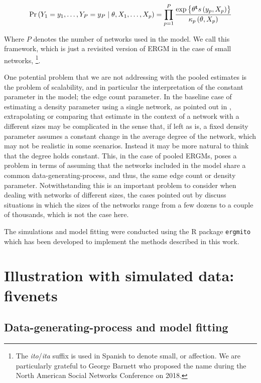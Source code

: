 \documentclass[12pt]{article}
\begin{document}
\begin{equation}
    \label{eq:ergm-pooled}
    \Prcond{\Adjmat_1 = \adjmat_1, \dots, \Adjmat_P = \adjmat_P}{\params, \Indepvar_1, \dots, \Indepvar_p} = \prod_{p=1}^P\frac{%
    		\exp{\transpose{\params}\sufstats{\adjmat_p, \Indepvar_p}}%
    	}{
    		\kappa_p\left(\params, \Indepvar_p\right)
    	}
\end{equation}

\noindent Where $P$ denotes the number of networks used in the model. We call this framework, which is just a revisited version of ERGM in the case of small networks, \ergmito{}\footnote{The \textit{ito}/\textit{ita} suffix is used in Spanish to denote small, or affection. We are particularly grateful to George Barnett who proposed the name during the North American Social Networks Conference on 2018.}.

One potential problem that we are not addressing with the pooled estimates is the problem of scalability, and in particular the interpretation of the constant parameter in the model; the edge count parameter. In the baseline case of estimating a density parameter using a single network, as pointed out in \cite{Krivitsky2011}, extrapolating or comparing that estimate in the context of a network with a different sizes may be complicated in the sense that, if left as is, a fixed density parameter assumes a constant change in the average degree of the network, which may not be realistic in some scenarios. Instead it may be more natural to think that the degree holds constant. This, in the case of pooled ERGMs, poses a problem in terms of assuming that the networks included in the model share a common data-generating-process, and thus, the same edge count or density parameter. Notwithstanding this is an important problem to consider when dealing with networks of different sizes, the cases pointed out by \cite{Krivitsky2011} discuss situations in which the sizes of the networks range from a few dozens to a couple of thousands, which is not the case here.

The simulations and model fitting were conducted using the R package \texttt{ergmito} which has been developed to implement the methods described in this work.

\section{Illustration with simulated data: fivenets}

\subsection{Data-generating-process and model fitting}
\end{document}
